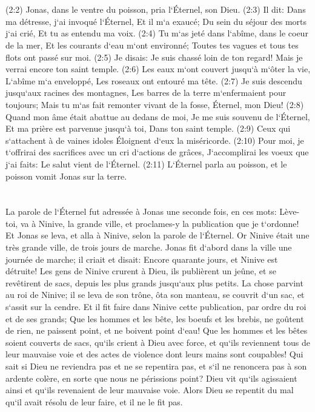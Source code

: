 \chapter{}

\verse (2:2) Jonas, dans le ventre du poisson, pria l`Éternel, son Dieu. 
\verse (2:3) Il dit: Dans ma détresse, j`ai invoqué l`Éternel, Et il m`a exaucé; Du sein du séjour des morts j`ai crié, Et tu as entendu ma voix. 
\verse (2:4) Tu m`as jeté dans l`abîme, dans le coeur de la mer, Et les courants d`eau m`ont environné; Toutes tes vagues et tous tes flots ont passé sur moi. 
\verse (2:5) Je disais: Je suis chassé loin de ton regard! Mais je verrai encore ton saint temple. 
\verse (2:6) Les eaux m`ont couvert jusqu`à m`ôter la vie, L`abîme m`a enveloppé, Les roseaux ont entouré ma tête. 
\verse (2:7) Je suis descendu jusqu`aux racines des montagnes, Les barres de la terre m`enfermaient pour toujours; Mais tu m`as fait remonter vivant de la fosse, Éternel, mon Dieu! 
\verse (2:8) Quand mon âme était abattue au dedans de moi, Je me suis souvenu de l`Éternel, Et ma prière est parvenue jusqu`à toi, Dans ton saint temple. 
\verse (2:9) Ceux qui s`attachent à de vaines idoles Éloignent d`eux la miséricorde. 
\verse (2:10) Pour moi, je t`offrirai des sacrifices avec un cri d`actions de grâces, J`accomplirai les voeux que j`ai faits: Le salut vient de l`Éternel. 
\verse (2:11) L`Éternel parla au poisson, et le poisson vomit Jonas sur la terre. 

\chapter{}

\verse La parole de l`Éternel fut adressée à Jonas une seconde fois, en ces mots: 
\verse Lève-toi, va à Ninive, la grande ville, et proclames-y la publication que je t`ordonne! 
\verse Et Jonas se leva, et alla à Ninive, selon la parole de l`Éternel. Or Ninive était une très grande ville, de trois jours de marche. 
\verse Jonas fit d`abord dans la ville une journée de marche; il criait et disait: Encore quarante jours, et Ninive est détruite! 
\verse Les gens de Ninive crurent à Dieu, ils publièrent un jeûne, et se revêtirent de sacs, depuis les plus grands jusqu`aux plus petits. 
\verse La chose parvint au roi de Ninive; il se leva de son trône, ôta son manteau, se couvrit d`un sac, et s`assit sur la cendre. 
\verse Et il fit faire dans Ninive cette publication, par ordre du roi et de ses grands; Que les hommes et les bête, les boeufs et les brebis, ne goûtent de rien, ne paissent point, et ne boivent point d`eau! 
\verse Que les hommes et les bêtes soient couverts de sacs, qu`ils crient à Dieu avec force, et qu`ils reviennent tous de leur mauvaise voie et des actes de violence dont leurs mains sont coupables! 
\verse Qui sait si Dieu ne reviendra pas et ne se repentira pas, et s`il ne renoncera pas à son ardente colère, en sorte que nous ne périssions point? 
\verse Dieu vit qu`ils agissaient ainsi et qu`ils revenaient de leur mauvaise voie. Alors Dieu se repentit du mal qu`il avait résolu de leur faire, et il ne le fit pas. 

